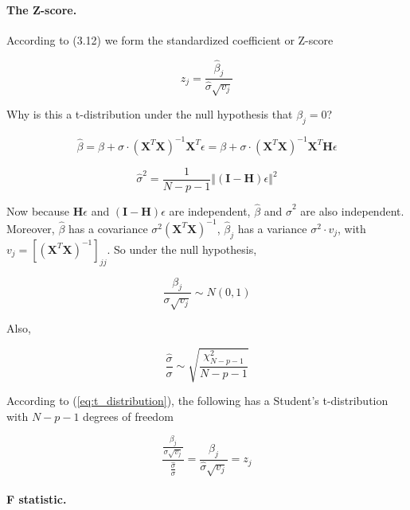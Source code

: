 \documentclass{article}
\begin{document}
\paragraph{The Z-score.}

According to (3.12) we form the standardized coefficient or Z-score

\begin{equation}
    z_j = \frac{\hat{\beta}_j}{\hat{\sigma} \sqrt{v_j}}
\end{equation}

Why is this a t-distribution under the null hypothesis that $\beta_j = 0$?

\begin{equation}
    \hat{\beta} = \beta + \sigma \cdot (\mathbf{X}^{T}\mathbf{X})^{-1}\mathbf{X}^{T}\epsilon = \beta + \sigma \cdot (\mathbf{X}^{T}\mathbf{X})^{-1}\mathbf{X}^{T} \mathbf{H} \epsilon
\end{equation}

\begin{equation}
    \hat{\sigma}^{2} = \frac{1}{N-p-1} \left\Vert(\textbf{I} - \textbf{H})\epsilon\right\Vert^{2}
\end{equation}

Now because $\textbf{H}\epsilon$ and $(\textbf{I} - \textbf{H})\epsilon$ are independent, $\hat{\beta}$ and $\hat{\sigma}^{2}$ are also independent. Moreover, $\hat{\beta}$ has a covariance $\sigma^2 (\textbf{X}^{T} \textbf{X})^{-1}$, $\hat{\beta}_j$ has a variance $\sigma^{2} \cdot v_j$, with $v_j = [(\textbf{X}^{T} \textbf{X})^{-1}]_{jj}$. So under the null hypothesis,

\begin{equation}
    \frac{\beta_j}{\sigma \sqrt{v_j}} \sim N(0,1)
\end{equation}

Also,

\begin{equation}
    \frac{\hat{\sigma}}{\sigma} \sim \sqrt{\frac{\chi_{N-p-1}^{2}}{N-p-1}}
\end{equation}

According to (\ref{eq:t_distribution}), the following has a Student's t-distribution with $N-p-1$ degrees of freedom

\begin{equation}
    \frac{\frac{\beta_j}{\sigma \sqrt{v_j}}}{\frac{\hat{\sigma}}{\sigma}} = \frac{\beta_j}{\hat{\sigma} \sqrt{v_j}} = z_j
\end{equation}

\paragraph{F statistic.}
\end{document}

